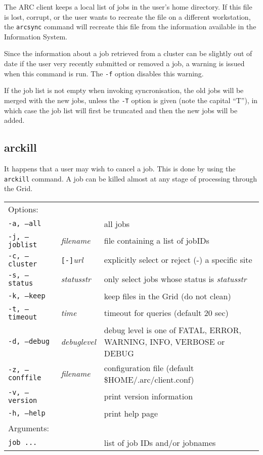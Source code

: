 The ARC client keeps a local list of jobs in the user's home
directory. If this file is lost,
corrupt, or the user wants to recreate the file on a different
workstation, the \texttt{arcsync} command will recreate this file from
the information available in the Information System.

Since  the  information  about  a job retrieved from a cluster can be slightly out of date if the user very recently
submitted or removed a job, a warning is issued when this command is run. The \verb#-f# option disables this warning.

If the job list is not empty when invoking syncronisation, the old jobs will be merged with the new jobs, unless
the \verb#-T# option is given (note the capital ``T''), in which case the job list will first be truncated and then the new jobs will be added.


\subsection{arckill}
\label{sec:arckill}

It happens that a user may wish to cancel a job. This is done by using
the \texttt{arckill}  command. A
job can be killed almost at any stage of processing through the Grid.

\hspace*{0.5cm}
\begin{shaded}
\end{shaded}
\begin{longtable}{llp{8cm}}
   Options:&&\\
   \texttt{-a, --all}& & all jobs\\
   \texttt{-j, --joblist}& \textit{filename} & file containing a list of jobIDs\\
   \texttt{-c, --cluster}&\verb#[-]#\textit{url}&explicitly select or reject (-) a specific site\\
   \texttt{-s, --status}& \textit{statusstr} &only select jobs whose status is \textit{statusstr}\\
   \texttt{-k, --keep}& & keep files in the Grid (do not clean)\\
   \texttt{-t, --timeout}& \textit{time} & timeout for queries (default 20 sec)\\
   \texttt{-d, --debug}& \textit{debuglevel}&debug level is one of  FATAL, ERROR, WARNING, INFO, VERBOSE or DEBUG\\
   \texttt{-z, --conffile}&\textit{filename}& configuration file (default {\$}HOME/.arc/client.conf)\\
   \texttt{-v, --version}& & print version information\\
   \texttt{-h, --help}& & print help page\\
   Arguments:&&\\
   \texttt{job ...} && list of job IDs and/or jobnames\\
\end{longtable}

